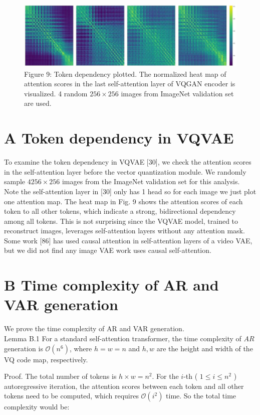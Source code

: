 \documentclass{article}
\begin{document}
\begin{figure}[h]
\begin{center}
  \includegraphics[width=\textwidth]{2025_10_26_62f95e615e8879e267a8g-12}
\captionsetup{labelformat=empty}
\caption{Figure 9: Token dependency plotted. The normalized heat map of attention scores in the last self-attention layer of VQGAN encoder is visualized. 4 random $256 \times 256$ images from ImageNet validation set are used.}
\end{center}
\end{figure}

\section*{A Token dependency in VQVAE}
To examine the token dependency in VQVAE [30], we check the attention scores in the self-attention layer before the vector quantization module. We randomly sample $4256 \times 256$ images from the ImageNet validation set for this analysis. Note the self-attention layer in [30] only has 1 head so for each image we just plot one attention map. The heat map in Fig. 9 shows the attention scores of each token to all other tokens, which indicate a strong, bidirectional dependency among all tokens. This is not surprising since the VQVAE model, trained to reconstruct images, leverages self-attention layers without any attention mask. Some work [86] has used causal attention in self-attention layers of a video VAE, but we did not find any image VAE work uses causal self-attention.

\section*{B Time complexity of AR and VAR generation}
We prove the time complexity of AR and VAR generation.\\
Lemma B.1 For a standard self-attention transformer, the time complexity of $A R$ generation is $\mathcal{O}\left(n^{6}\right)$, where $h=w=n$ and $h, w$ are the height and width of the VQ code map, respectively.

Proof. The total number of tokens is $h \times w=n^{2}$. For the $i$-th ( $1 \leq i \leq n^{2}$ ) autoregressive iteration, the attention scores between each token and all other tokens need to be computed, which requires $\mathcal{O}\left(i^{2}\right)$ time. So the total time complexity would be:
\end{document}
